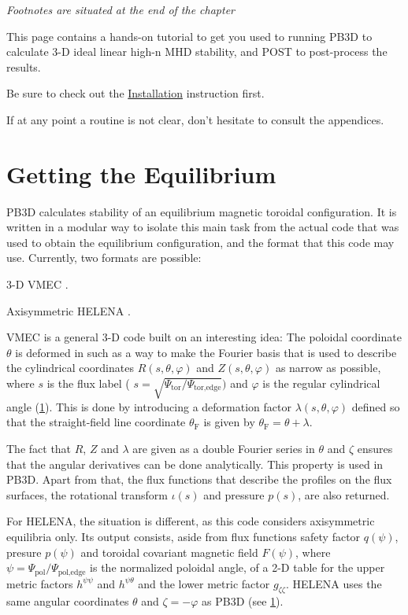  
    \textit{\scriptsize Footnotes are situated at the end of the chapter}


This page contains a hands-\/on tutorial to get you used to running P\+B3D to calculate 3-\/D ideal linear high-\/n M\+HD stability, and P\+O\+ST to post-\/process the results.

Be sure to check out the \hyperlink{page_installation}{Installation} instruction first.

  
If at any point a routine is not clear, don't hesitate to consult the appendices.
\hypertarget{page_tutorial_tutorial_eq}{}\section{Getting the Equilibrium}\label{page_tutorial_tutorial_eq}
P\+B3D calculates stability of an equilibrium magnetic toroidal configuration. It is written in a modular way to isolate this main task from the actual code that was used to obtain the equilibrium configuration, and the format that this code may use. Currently, two formats are possible\+:
\begin{DoxyItemize}
\item 3-\/D V\+M\+EC \cite{hirshman1983vmec}.
\item Axisymmetric H\+E\+L\+E\+NA \cite{mikhailovskii1997optimization}.
\end{DoxyItemize}

V\+M\+EC is a general 3-\/D code built on an interesting idea\+: The poloidal coordinate $\theta$ is deformed in such as a way to make the Fourier basis that is used to describe the cylindrical coordinates $R(s,\theta,\varphi)$ and $Z(s,\theta,\varphi)$ as narrow as possible, where $s$ is the flux label ( $s=\sqrt{\Psi_\text{tor}/\Psi_{\text{tor,edge}}})$ and $\varphi$ is the regular cylindrical angle (\hyperlink{page_tutorial_fnt1}{1}). This is done by introducing a deformation factor $\lambda(s,\theta,\varphi)$ defined so that the straight-\/field line coordinate $\theta_\text{F}$ is given by $\theta_\text{F} = \theta + \lambda $.

The fact that $R$, $Z$ and $\lambda$ are given as a double Fourier series in $\theta$ and $\zeta$ ensures that the angular derivatives can be done analytically. This property is used in P\+B3D. Apart from that, the flux functions that describe the profiles on the flux surfaces, the rotational transform $\iota(s)$ and pressure $p(s)$, are also returned.

For H\+E\+L\+E\+NA, the situation is different, as this code considers axisymmetric equilibria only. Its output consists, aside from flux functions safety factor $q(\psi)$, presure $p(\psi)$ and toroidal covariant magnetic field $F(\psi)$, where $\psi=\Psi_\text{pol}/\Psi_{\text{pol,edge}}$ is the normalized poloidal angle, of a 2-\/D table for the upper metric factors $h^{\psi\psi}$ and $h^{\psi\theta}$ and the lower metric factor $g_{\zeta\zeta}$. H\+E\+L\+E\+NA uses the same angular coordinates $\theta$ and $\zeta = -\varphi$ as P\+B3D (see \hyperlink{page_tutorial_fnt1}{1}).

